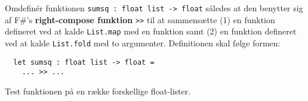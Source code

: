 Omdefinér funktionen \lstinline{sumsq : float list -> float} således
at den benytter sig af F\#'s \textbf{right-compose
funktion} \lstinline{>>} til at sammensætte (1) en funktion defineret
ved at kalde \lstinline{List.map} med en funktion samt (2) en funktion
defineret ved at kalde \lstinline{List.fold} med to
argumenter. Definitionen skal følge formen:
\begin{lstlisting}
  let sumsq : float list -> float =
    ... >> ...
\end{lstlisting}
%
Test funktionen på en række forskellige float-lister.
